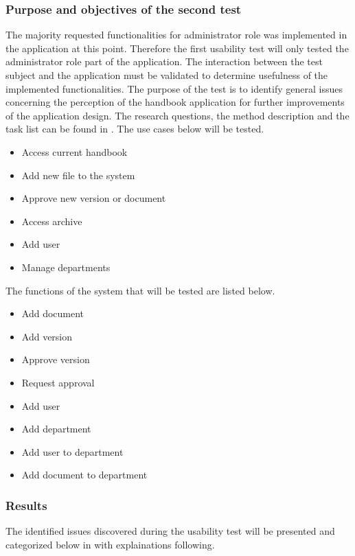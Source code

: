 \subsubsection*{Purpose and objectives of the second test}
The majority requested functionalities for administrator role was implemented in the application at this point.
Therefore the first usability test will only tested the administrator role part of the application.
The interaction between the test subject and the application must be validated to determine usefulness of the implemented functionalities.
The purpose of the test is to identify general issues concerning the perception of the handbook application for further improvements of the application design.
The research questions, the method description and the task list can be found in .
The use cases below will be tested.

\begin{itemize}
	\item Access current handbook
	\item Add new file to the system
	\item Approve new version or document
	\item Access archive
	\item Add user
	\item Manage departments
\end{itemize}

The functions of the system that will be tested are listed below.

\begin{itemize}
	\item Add document
	\item Add version
	\item Approve version
	\item Request approval
	\item Add user
	\item Add department
	\item Add user to department
	\item Add document to department
\end{itemize}

\subsubsection*{Results}
The identified issues discovered during the usability test will be presented and categorized below in  with explainations following.

